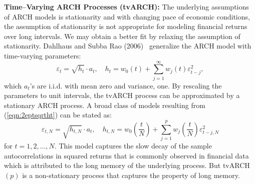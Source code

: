 \noindent \textbf{Time--Varying ARCH Processes (tvARCH):} The underlying assumptions of ARCH models is stationarity and with changing pace of economic conditions, the assumption of stationarity is not appropriate for modeling financial returns over long intervals. We may obtain a better fit by relaxing the assumption of stationarity. Dahlhaus and Subba Rao (2006)~\cite{dahlhaus2006} generalize the ARCH model with time-varying parameters:
	\begin{equation}\label{eqn:2eptsqrtht}
	\varepsilon_t = \sqrt{h_t}\cdot a_t,\quad h_t = w_0(t) + \sum_{j=1}^{\infty}w_j(t)\varepsilon_{t-j}^2,
	\end{equation}
which $a_t$'s are i.i.d. with mean zero and variance, one. By rescaling the parameters to unit intervals, the tvARCH process can be approximated by a stationary ARCH process. A broad class of models resulting from (\ref{eqn:2eptsqrtht}) can be stated as:
	\begin{equation}\label{eqn:2eptN}
	\varepsilon_{t,N} = \sqrt{h_{t,N}}\cdot a_t,\quad h_{t,N} = w_0\left(\frac{t}{N}\right) + \sum_{j=1}^pw_j \left(\frac{t}{N}\right) \varepsilon_{t-j,N}^2
	\end{equation}
for $t= 1,2,\ldots,N$. This model captures the slow decay of the sample autocorrelations in squared returns that is commonly observed in financial data which is attributed to the long memory of the underlying process. But tvARCH$(p)$ is a non-stationary process that captures the property of long memory.


